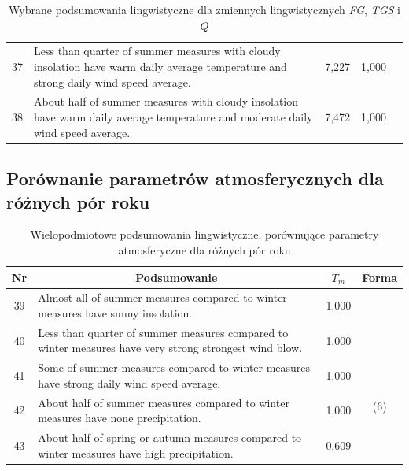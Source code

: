 \documentclass{classrep}
\begin{document}
\begin{table}[H]
\begin{center}
\begin{tabularx}{\linewidth}{ |c|X|c|c|c| }
37	&	Less than quarter of summer measures with cloudy insolation have warm daily average temperature and strong daily wind speed average.	&	7,227	&	1,000	& \\	\cline{1-4}
38	&	About half of summer measures with cloudy insolation have warm daily average temperature and moderate daily wind speed average.	&	7,472	&	1,000	& \\
\hline
\end{tabularx}
\caption{Wybrane podsumowania lingwistyczne dla zmiennych lingwistycznych \textit{FG}, \textit{TGS} i $Q$}
\end{center}
\end{table}

\clearpage


\subsection{Porównanie parametrów atmosferycznych dla różnych pór roku}

\begin{table}[H]
\begin{center}
\begin{tabularx}{\linewidth}{ |c|X|c|c| } 
\hline
Nr & \multicolumn{1}{|c|}{Podsumowanie} & $T_m$ & Forma \\
\hline
39	&	Almost all of summer measures compared to winter measures have sunny insolation.	&	1,000	& \multirow{5}{1em}{\newline\newline\newline\newline(6)} \\ \cline{1-3}	
40	&	Less than quarter of summer measures compared to winter measures have very strong strongest wind blow.	&	1,000	& \\	\cline{1-3}
41	&	Some of summer measures compared to winter measures have strong daily wind speed average.	&	1,000	& \\	\cline{1-3}
42	&	About half of summer measures compared to winter measures have none precipitation.	&	1,000	& \\	\cline{1-3}
43	&	About half of spring or autumn measures compared to winter measures have high precipitation.	&	0,609	& \\
\hline
\end{tabularx}
\caption{Wielopodmiotowe podsumowania lingwistyczne, porównujące parametry atmosferyczne dla różnych pór roku}
\end{center}
\end{table}
\end{document}
